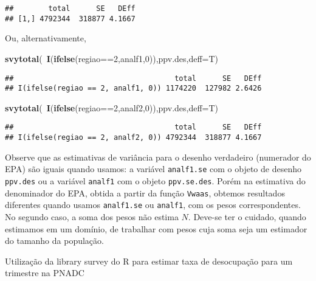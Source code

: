 \documentclass[]{book}
\newenvironment{Shaded}{\begin{snugshade}}{\end{snugshade}}
\newcommand{\KeywordTok}[1]{\textcolor[rgb]{0.13,0.29,0.53}{\textbf{{#1}}}}
\newcommand{\DataTypeTok}[1]{\textcolor[rgb]{0.13,0.29,0.53}{{#1}}}
\newcommand{\DecValTok}[1]{\textcolor[rgb]{0.00,0.00,0.81}{{#1}}}
\newcommand{\NormalTok}[1]{{#1}}
\theoremstyle{definition}
\theoremstyle{definition}
\theoremstyle{remark}
\let\BeginKnitrBlock\begin \let\EndKnitrBlock\end
\begin{document}
\begin{verbatim}
##        total      SE   DEff
## [1,] 4792344  318877 4.1667
\end{verbatim}

Ou, alternativamente,

\begin{Shaded}
\begin{Highlighting}[]
\KeywordTok{svytotal}\NormalTok{(~}\KeywordTok{I}\NormalTok{(}\KeywordTok{ifelse}\NormalTok{(regiao==}\DecValTok{2}\NormalTok{,analf1,}\DecValTok{0}\NormalTok{)),ppv.des,}\DataTypeTok{deff=}\NormalTok{T)}
\end{Highlighting}
\end{Shaded}

\begin{verbatim}
##                                     total      SE   DEff
## I(ifelse(regiao == 2, analf1, 0)) 1174220  127982 2.6426
\end{verbatim}

\begin{Shaded}
\begin{Highlighting}[]
\KeywordTok{svytotal}\NormalTok{(~}\KeywordTok{I}\NormalTok{(}\KeywordTok{ifelse}\NormalTok{(regiao==}\DecValTok{2}\NormalTok{,analf2,}\DecValTok{0}\NormalTok{)),ppv.des,}\DataTypeTok{deff=}\NormalTok{T)}
\end{Highlighting}
\end{Shaded}

\begin{verbatim}
##                                     total      SE   DEff
## I(ifelse(regiao == 2, analf2, 0)) 4792344  318877 4.1667
\end{verbatim}

Observe que as estimativas de variância para o desenho verdadeiro
(numerador do EPA) são iguais quando usamos: a variável
\texttt{analf1.se} com o objeto de desenho \texttt{ppv.des} ou a
variável \texttt{analf1} com o objeto \texttt{ppv.se.des}. Porém na
estimativa do denominador do EPA, obtida a partir da função
\texttt{Vwaas}, obtemos resultados diferentes quando usamos
\texttt{analf1.se} ou \texttt{analf1}, com os pesos correspondentes. No
segundo caso, a soma dos pesos não estima \(N\). Deve-se ter o cuidado,
quando estimamos em um domínio, de trabalhar com pesos cuja soma seja um
estimador do tamanho da população.

\BeginKnitrBlock{example}
\protect\hypertarget{ex:unnamed-chunk-20}{}{\label{ex:unnamed-chunk-20}}Utilização
da library survey do R para estimar taxa de desocupação para um
trimestre na PNADC
\EndKnitrBlock{example}
\end{document}
